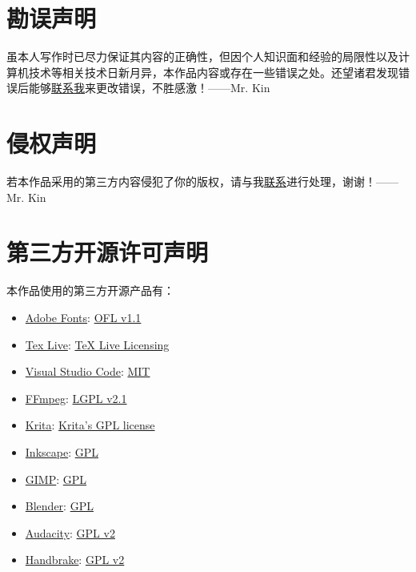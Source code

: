 \documentclass[11pt,a4paper,UTF8,titlepage]{ctexart} %
\begin{document}
    \section*{\bfseries \sffamily 勘误声明}
    虽本人写作时已尽力保证其内容的正确性，但因个人知识面和经验的局限性以及计算机技术等相关技术日新月异，本作品内容或存在一些错误之处。还望诸君发现错误后能够\hyperlink{contact}{联系我}来更改错误，不胜感激！——Mr. Kin

    \section*{\bfseries \sffamily 侵权声明}
    若本作品采用的第三方内容侵犯了你的版权，请与我\hyperlink{contact}{联系}进行处理，谢谢！——Mr. Kin

    \section*{\bfseries \sffamily 第三方开源许可声明}
    本作品使用的第三方开源产品有：
    \begin{multicols}{2}
    \begin{itemize}
        \item \href{https://github.com/adobe-fonts}{Adobe Fonts}: \href{http://scripts.sil.org/cms/scripts/page.php?site_id=nrsi&id=OFL}{OFL v1.1}
        \item \href{https://tug.org/texlive/}{Tex Live}: \href{https://tug.org/texlive/copying.html}{TeX Live Licensing}
        \item \href{https://code.visualstudio.com/}{Visual Studio Code}: \href{https://www.mit-license.org/}{MIT}
        \item \href{http://ffmpeg.org/}{FFmpeg}: \href{http://ffmpeg.org/legal.html}{LGPL v2.1}
        \item \href{https://krita.org/en/}{Krita}: \href{https://docs.krita.org/en/KritaFAQ.html?highlight=license#license-rights-and-the-krita-foundation}{Krita's GPL license}
        \item \href{https://inkscape.org/}{Inkscape}: \href{https://inkscape.org/about/license/}{GPL}
        \item \href{https://www.gimp.org}{GIMP}: \href{https://www.gimp.org/about/COPYING}{GPL}
        \item \href{https://www.blender.org}{Blender}: \href{https://www.blender.org/about/license/}{GPL}
        \item \href{https://www.audacityteam.org/}{Audacity}: \href{https://www.gnu.org/licenses/old-licenses/gpl-2.0.en.html}{GPL v2}
        \item \href{https://handbrake.fr}{Handbrake}: \href{https://github.com/HandBrake/HandBrake/blob/master/LICENSE}{GPL v2}
    \end{itemize}
    \end{multicols}

    \ifx\collections\undefined
    \printbibliography %
    \clearpage %
    \printindex %
\end{document}
